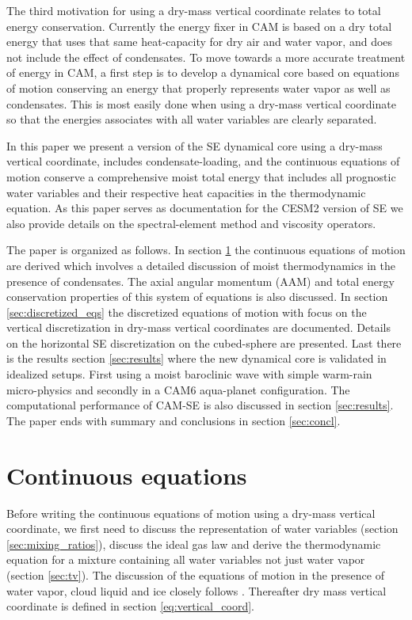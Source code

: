 \documentclass{agujournal}
\begin{document}
{The third motivation for using a dry-mass vertical coordinate relates to total energy conservation. Currently the energy fixer in CAM is based on a dry total energy \citep{WOHTTV2015JAMES} that uses that same heat-capacity for dry air and water vapor, and does not include the effect of condensates. To move towards a more accurate treatment of energy in CAM, a first step is to develop a dynamical core based on equations of motion conserving an energy that properly represents water vapor as well as condensates. This is most easily done when using a dry-mass vertical coordinate so that the energies associates with all water variables are clearly separated.

In this paper we present a version of the SE dynamical core using a dry-mass vertical coordinate, includes condensate-loading, and the continuous equations of motion conserve a comprehensive moist total energy that includes all prognostic water variables and their respective heat capacities in the thermodynamic equation. As this paper serves as documentation for the CESM2 version of SE we also provide details on the spectral-element method and viscosity operators. 

The paper is organized as follows. In section \ref{sec:cont-eq} the continuous equations of motion are derived which involves a detailed discussion of moist thermodynamics in the presence of condensates. The axial angular momentum (AAM) and total energy conservation properties of this system of equations is also discussed. In section \ref{sec:discretized_eqs} the discretized equations of motion with focus on the vertical discretization in dry-mass vertical coordinates are documented. Details on the horizontal SE discretization on the cubed-sphere are presented. Last there is the results section \ref{sec:results} where the new dynamical core is validated in idealized setups. First using a moist baroclinic wave with simple warm-rain micro-physics and secondly in a CAM6 aqua-planet configuration. The computational performance of CAM-SE is also discussed in section \ref{sec:results}. The paper ends with summary and conclusions in section \ref{sec:concl}.
%
\section{Continuous equations}\label{sec:cont-eq}
Before writing the continuous equations of motion using a dry-mass vertical coordinate, we first need to discuss the representation of water variables (section \ref{sec:mixing_ratios}), discuss the ideal gas law and derive the thermodynamic equation for a mixture containing all water variables not just water vapor (section \ref{sec:tv}). The discussion of the equations of motion in the presence of water vapor, cloud liquid and ice closely follows \citet{joyOfUM}. Thereafter dry mass vertical coordinate is defined in section \ref{eq:vertical_coord}. {\color{red}{more details on other sections}}
}
\end{document}
